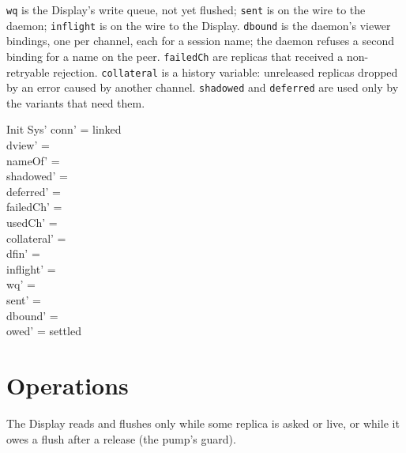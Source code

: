 \documentclass[a4paper,10pt,fleqn]{article}
\begin{document}
\texttt{wq} is the Display's write queue, not yet flushed; \texttt{sent} is
on the wire to the daemon; \texttt{inflight} is on the wire to the Display.
\texttt{dbound} is the daemon's viewer bindings, one per channel, each for a
session name; the daemon refuses a second binding for a name on the peer.
\texttt{failedCh} are replicas that received a non-retryable rejection.
\texttt{collateral} is a history variable: unreleased replicas dropped by an
error caused by another channel.  \texttt{shadowed} and \texttt{deferred} are
used only by the variants that need them.

\begin{schema}{Init}
  Sys'
\where
  conn' = linked \\
  dview' = \emptyset \\
  nameOf' = \emptyset \\
  shadowed' = \emptyset \\
  deferred' = \emptyset \\
  failedCh' = \emptyset \\
  usedCh' = \emptyset \\
  collateral' = \emptyset \\
  dfin' = \emptyset \\
  inflight' = \langle \rangle \\
  wq' = \langle \rangle \\
  sent' = \langle \rangle \\
  dbound' = \emptyset \\
  owed' = settled
\end{schema}

\section{Operations}

The Display reads and flushes only while some replica is asked or live, or
while it owes a flush after a release (the pump's guard).
\end{document}
